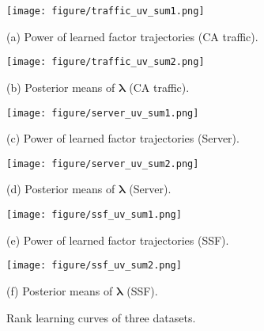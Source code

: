 \begin{figure*}[h]
    \centering
    \begin{minipage}{0.41\textwidth}
        \centering
        \texttt{[image: figure/traffic\_uv\_sum1.png]}
        \caption*{(a) Power  of learned factor trajectories (CA traffic).}
    \end{minipage}
    \begin{minipage}{0.41\textwidth}
        \centering
        \texttt{[image: figure/traffic\_uv\_sum2.png]}
        \caption*{(b) Posterior means of $\boldsymbol{\lambda}$ (CA traffic).}
    \end{minipage}
    
    \vspace{2mm}
        \begin{minipage}{0.41\textwidth}
        \centering
        \texttt{[image: figure/server\_uv\_sum1.png]}
        \caption*{(c) Power  of learned factor trajectories (Server).}
    \end{minipage}
    \begin{minipage}{0.41\textwidth}
        \centering
        \texttt{[image: figure/server\_uv\_sum2.png]}
        \caption*{(d) Posterior means of $\boldsymbol{\lambda}$ (Server).}
    \end{minipage}
    
        \vspace{2mm}
        \begin{minipage}{0.41\textwidth}
        \centering
        \texttt{[image: figure/ssf\_uv\_sum1.png]}
        \caption*{(e) Power  of learned factor trajectories (SSF).}
    \end{minipage}
    \begin{minipage}{0.41\textwidth}
        \centering
        \texttt{[image: figure/ssf\_uv\_sum2.png]}
        \caption*{(f) Posterior means of $\boldsymbol{\lambda}$ (SSF).}
    \end{minipage}
    \caption{Rank learning curves of three datasets.}
    \label{fig:learning_curve_three}
\end{figure*}

